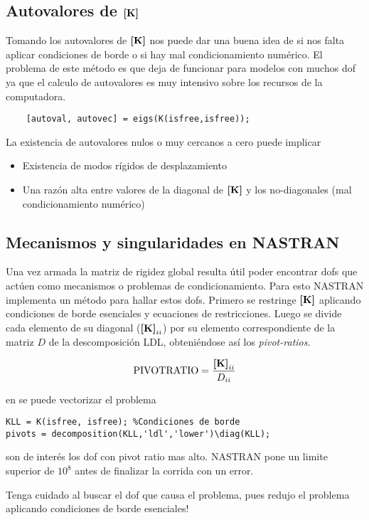 \subsection*{Autovalores de $\boldsymbol{[}\mathbf{K} \boldsymbol{]}$}
Tomando los autovalores de $\boldsymbol{[}\mathbf{K} \boldsymbol{]}$ nos puede dar una buena idea de si nos falta aplicar condiciones de borde o si hay mal condicionamiento numérico. El problema de este método es que deja de funcionar para modelos con muchos dof ya que el calculo de autovalores es muy intensivo sobre los recursos de la computadora.
\begin{lstlisting}
    [autoval, autovec] = eigs(K(isfree,isfree));
\end{lstlisting}

La existencia de autovalores nulos o muy cercanos a cero puede implicar 
\begin{itemize}
    \item Existencia de modos rígidos de desplazamiento
    \item Una razón alta entre valores de la diagonal de $\boldsymbol{[}\mathbf{K} \boldsymbol{]}$ y los no-diagonales (mal condicionamiento numérico)
\end{itemize}
\subsection*{Mecanismos y singularidades en NASTRAN}
Una vez armada la matriz de rigidez global resulta útil poder encontrar dofs que actúen como mecanismos o problemas de condicionamiento. Para esto NASTRAN implementa un método para hallar estos dofs. Primero se restringe \(\boldsymbol{[}\mathbf{K} \boldsymbol{]} \) aplicando condiciones de borde esenciales y ecuaciones de restricciones. Luego se divide cada elemento de su diagonal ($\boldsymbol{[}\mathbf{K} \boldsymbol{]}_{ii}$) por su elemento correspondiente de la matriz $D$ de la descomposición LDL, obteniéndose así los \textit{pivot-ratios}.

\[
\text{PIVOTRATIO} = \frac{\boldsymbol{[}\mathbf{K} \boldsymbol{]}_{ii}}{D_{ii}}
\]

en \Matlab{} se puede vectorizar el problema
\begin{lstlisting}[caption = {Rutina MAXPIVOT de NASTRAN.}]
KLL = K(isfree, isfree); %Condiciones de borde
pivots = decomposition(KLL,'ldl','lower')\diag(KLL);
\end{lstlisting}
son de interés los dof con pivot ratio mas alto. NASTRAN pone un limite superior de $10^8$ antes de finalizar la corrida con un error.

Tenga cuidado al buscar el dof que causa el problema, pues redujo el problema aplicando condiciones de borde esenciales! 
